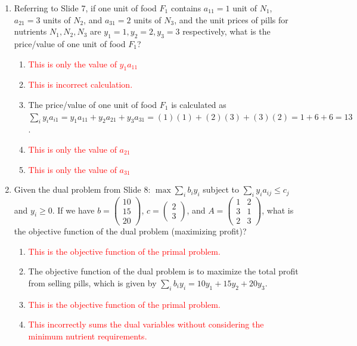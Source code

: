 \documentclass{article}%
\newcommand{\incorrect}[1]{\textcolor{red}{#1}}
\begin{document}
\begin{enumerate}
\vspace{1em}%
\item Referring to Slide 7, if one unit of food $F_1$ contains $a_{11} = 1$ unit of $N_1$, $a_{21} = 3$ units of $N_2$, and $a_{31} = 2$ units of $N_3$, and the unit prices of pills for nutrients $N_1, N_2, N_3$ are $y_1 = 1, y_2 = 2, y_3 = 3$ respectively, what is the price/value of one unit of food $F_1$?%
\begin{enumerate}%
\item \incorrect{This is only the value of $y_1 a_{11}$}%
\item \incorrect{This is incorrect calculation.}%
\item The price/value of one unit of food $F_1$ is calculated as $\sum_i y_i a_{i1} = y_1 a_{11} + y_2 a_{21} + y_3 a_{31} = (1)(1) + (2)(3) + (3)(2) = 1 + 6 + 6 = 13$.%
\item \incorrect{This is only the value of $a_{21}$}%
\item \incorrect{This is only the value of $a_{31}$}%
\end{enumerate}%
\vspace{1em}%
\item Given the dual problem from Slide 8: $\max \sum_i b_i y_i$ subject to $\sum_i y_i a_{ij} \le c_j$ and $y_i \ge 0$. If we have $b = \begin{pmatrix} 10 \\ 15 \\ 20 \end{pmatrix}$, $c = \begin{pmatrix} 2 \\ 3 \end{pmatrix}$, and $A = \begin{pmatrix} 1 & 2 \\ 3 & 1 \\ 2 & 3 \end{pmatrix}$, what is the objective function of the dual problem (maximizing profit)?%
\begin{enumerate}%
\item \incorrect{This is the objective function of the primal problem.}%
\item The objective function of the dual problem is to maximize the total profit from selling pills, which is given by $\sum_i b_i y_i = 10y_1 + 15y_2 + 20y_3$.%
\item \incorrect{This is the objective function of the primal problem.}%
\item \incorrect{This incorrectly sums the dual variables without considering the minimum nutrient requirements.}%

\end{enumerate}
\end{enumerate}
\end{document}
